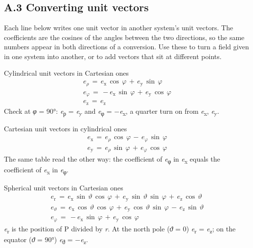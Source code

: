 \documentclass[11pt]{article}
\begin{document}
\begin{keepsection}
\section{A.3 Converting unit vectors}

Each line below writes one unit vector in another system’s unit vectors. The coefficients are the cosines of the angles between the two directions, so the same numbers appear in both directions of a conversion. Use these to turn a field given in one system into another, or to add vectors that sit at different points.

\begin{equationcard}{Cylindrical unit vectors in Cartesian ones}
\[ \begin{gathered} {e}_{ρ}\, =\, {e}_{\mathrm{x}}\, \cos \, {φ}\, +\, {e}_{\mathrm{y}}\, \sin \, {φ} \\ {e}_{φ}\, =\, -{e}_{\mathrm{x}}\, \sin \, {φ}\, +\, {e}_{\mathrm{y}}\, \cos \, {φ} \\ {e}_{\mathrm{z}}\, =\, {e}_{\mathrm{z}} \end{gathered} \]
{\small Check at \textit{φ} = 90°: \textit{e}\textsubscript{ρ} = \textit{e}\textsubscript{y} and \textit{e}\textsubscript{φ} = \ensuremath{-}\textit{e}\textsubscript{x}, a quarter turn on from \textit{e}\textsubscript{x}, \textit{e}\textsubscript{y}.}
\end{equationcard}

\begin{equationcard}{Cartesian unit vectors in cylindrical ones}
\[ \begin{gathered} {e}_{\mathrm{x}}\, =\, {e}_{ρ}\, \cos \, {φ}\, -\, {e}_{φ}\, \sin \, {φ} \\ {e}_{\mathrm{y}}\, =\, {e}_{ρ}\, \sin \, {φ}\, +\, {e}_{φ}\, \cos \, {φ} \end{gathered} \]
{\small The same table read the other way: the coefficient of \textit{e}\textsubscript{φ} in \textit{e}\textsubscript{x} equals the coefficient of \textit{e}\textsubscript{x} in \textit{e}\textsubscript{φ}.}
\end{equationcard}

\begin{equationcard}{Spherical unit vectors in Cartesian ones}
\[ \begin{gathered} {e}_{\mathrm{r}}\, =\, {e}_{\mathrm{x}}\, \sin \, {ϑ}\, \cos \, {φ}\, +\, {e}_{\mathrm{y}}\, \sin \, {ϑ}\, \sin \, {φ}\, +\, {e}_{\mathrm{z}}\, \cos \, {ϑ} \\ {e}_{ϑ}\, =\, {e}_{\mathrm{x}}\, \cos \, {ϑ}\, \cos \, {φ}\, +\, {e}_{\mathrm{y}}\, \cos \, {ϑ}\, \sin \, {φ}\, -\, {e}_{\mathrm{z}}\, \sin \, {ϑ} \\ {e}_{φ}\, =\, -{e}_{\mathrm{x}}\, \sin \, {φ}\, +\, {e}_{\mathrm{y}}\, \cos \, {φ} \end{gathered} \]
{\small \textit{e}\textsubscript{r} is the position of P divided by \textit{r}. At the north pole (\textit{ϑ} = 0) \textit{e}\textsubscript{r} = \textit{e}\textsubscript{z}; on the equator (\textit{ϑ} = 90°) \textit{e}\textsubscript{ϑ} = \ensuremath{-}\textit{e}\textsubscript{z}.}
\end{equationcard}


\end{keepsection}
\end{document}
